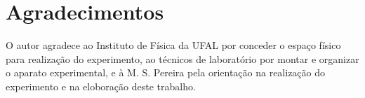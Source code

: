 \section*{Agradecimentos}

O autor agradece ao Instituto de Física da UFAL por conceder o
espaço físico para realização do experimento, ao técnicos de 
laboratório por montar e organizar o aparato experimental, e à 
M. S. Pereira pela orientação na realização do experimento 
e na eloboração deste trabalho. 
